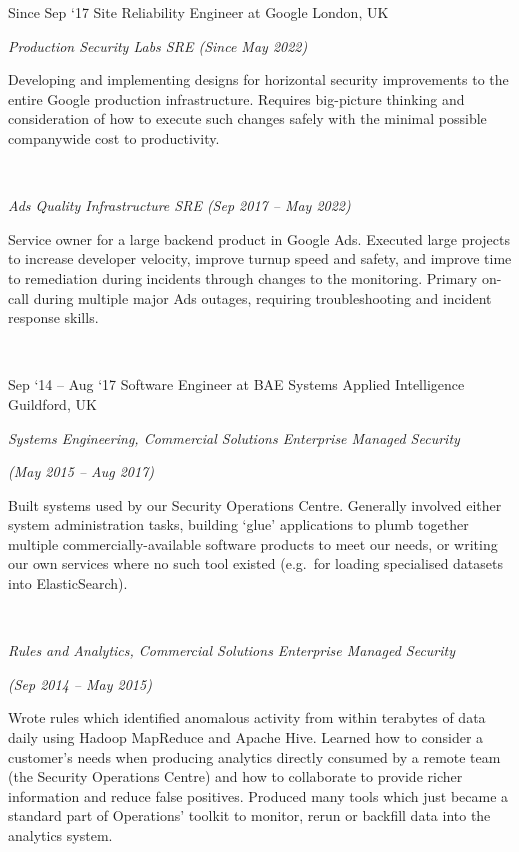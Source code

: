\documentclass[a4paper]{friggeri-cv} %
\begin{document}
\begin{entrylist}
\entry
{{\footnotesize Since Sep `17}}
{Site Reliability Engineer at Google}
{London, UK}
{\emph{Production Security Labs SRE (Since May 2022)} 

Developing and implementing designs for horizontal security improvements
to the entire Google production infrastructure.  Requires big-picture thinking and
consideration of how to execute such changes safely with the minimal possible
companywide cost to productivity.

~

\emph{Ads Quality Infrastructure SRE (Sep 2017 -- May 2022)}

Service owner for a large backend product in Google Ads.  Executed large
projects to increase developer velocity, improve turnup speed and
safety, and improve time to remediation during incidents through changes
to the monitoring.  Primary on-call during multiple major Ads outages, requiring troubleshooting
and incident response skills.

~

}
\entry
{{\footnotesize Sep `14 -- Aug `17}}
{Software Engineer at BAE Systems Applied Intelligence}
{Guildford, UK}
{\emph{Systems Engineering, Commercial Solutions Enterprise Managed Security}

\emph{(May 2015 -- Aug 2017)}

Built systems used by our Security Operations Centre.  Generally involved
either system administration tasks, building `glue' applications to plumb
together multiple commercially-available software products to meet our
needs, or writing our own services where no such tool existed (e.g.\ for
loading specialised datasets into ElasticSearch).

~

\emph{Rules and Analytics, Commercial Solutions Enterprise Managed Security}

\emph{(Sep 2014 -- May 2015)}

Wrote rules which identified anomalous activity from within terabytes of data
daily using Hadoop MapReduce and Apache Hive.  Learned how to consider
a customer's needs when producing analytics directly consumed by a remote
team (the Security Operations Centre) and how to collaborate to
provide richer information and reduce false positives.  Produced many
tools which just became a standard part of Operations' toolkit to monitor, rerun
or backfill data into the analytics system.
}
\end{entrylist}
\end{document}
